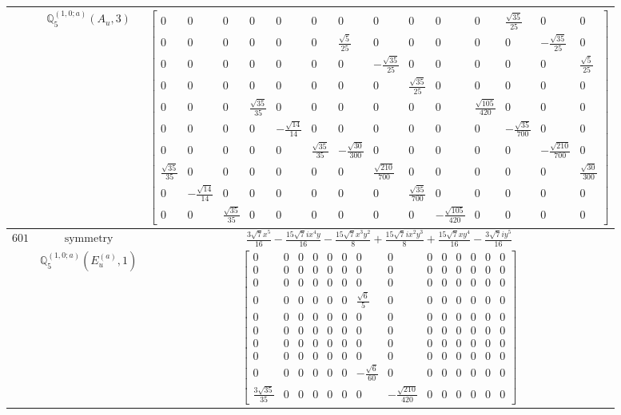 \documentclass[fleqn,8pt,landscape]{jsarticle}
\begin{document}
\begin{longtable}{ccc}
$  $ & $ \mathbb{Q}_{5}^{(1,0;a)}(A_{u},3) $ & $ \begin{bmatrix} 0 & 0 & 0 & 0 & 0 & 0 & 0 & 0 & 0 & 0 & 0 & \frac{\sqrt{35}}{25} & 0 & 0 \\ 0 & 0 & 0 & 0 & 0 & 0 & \frac{\sqrt{5}}{25} & 0 & 0 & 0 & 0 & 0 & - \frac{\sqrt{35}}{25} & 0 \\ 0 & 0 & 0 & 0 & 0 & 0 & 0 & - \frac{\sqrt{35}}{25} & 0 & 0 & 0 & 0 & 0 & \frac{\sqrt{5}}{25} \\ 0 & 0 & 0 & 0 & 0 & 0 & 0 & 0 & \frac{\sqrt{35}}{25} & 0 & 0 & 0 & 0 & 0 \\ 0 & 0 & 0 & \frac{\sqrt{35}}{35} & 0 & 0 & 0 & 0 & 0 & 0 & \frac{\sqrt{105}}{420} & 0 & 0 & 0 \\ 0 & 0 & 0 & 0 & - \frac{\sqrt{14}}{14} & 0 & 0 & 0 & 0 & 0 & 0 & - \frac{\sqrt{35}}{700} & 0 & 0 \\ 0 & 0 & 0 & 0 & 0 & \frac{\sqrt{35}}{35} & - \frac{\sqrt{30}}{300} & 0 & 0 & 0 & 0 & 0 & - \frac{\sqrt{210}}{700} & 0 \\ \frac{\sqrt{35}}{35} & 0 & 0 & 0 & 0 & 0 & 0 & \frac{\sqrt{210}}{700} & 0 & 0 & 0 & 0 & 0 & \frac{\sqrt{30}}{300} \\ 0 & - \frac{\sqrt{14}}{14} & 0 & 0 & 0 & 0 & 0 & 0 & \frac{\sqrt{35}}{700} & 0 & 0 & 0 & 0 & 0 \\ 0 & 0 & \frac{\sqrt{35}}{35} & 0 & 0 & 0 & 0 & 0 & 0 & - \frac{\sqrt{105}}{420} & 0 & 0 & 0 & 0 \end{bmatrix} $ \\ \hline
$ 601 $ & $ \text{symmetry} $ & $ \frac{3 \sqrt{7} x^{5}}{16} - \frac{15 \sqrt{7} i x^{4} y}{16} - \frac{15 \sqrt{7} x^{3} y^{2}}{8} + \frac{15 \sqrt{7} i x^{2} y^{3}}{8} + \frac{15 \sqrt{7} x y^{4}}{16} - \frac{3 \sqrt{7} i y^{5}}{16} $ \\
$  $ & $ \mathbb{Q}_{5}^{(1,0;a)}(E_{u}^{(a)},1) $ & $ \begin{bmatrix} 0 & 0 & 0 & 0 & 0 & 0 & 0 & 0 & 0 & 0 & 0 & 0 & 0 & 0 \\ 0 & 0 & 0 & 0 & 0 & 0 & 0 & 0 & 0 & 0 & 0 & 0 & 0 & 0 \\ 0 & 0 & 0 & 0 & 0 & 0 & 0 & 0 & 0 & 0 & 0 & 0 & 0 & 0 \\ 0 & 0 & 0 & 0 & 0 & 0 & \frac{\sqrt{6}}{5} & 0 & 0 & 0 & 0 & 0 & 0 & 0 \\ 0 & 0 & 0 & 0 & 0 & 0 & 0 & 0 & 0 & 0 & 0 & 0 & 0 & 0 \\ 0 & 0 & 0 & 0 & 0 & 0 & 0 & 0 & 0 & 0 & 0 & 0 & 0 & 0 \\ 0 & 0 & 0 & 0 & 0 & 0 & 0 & 0 & 0 & 0 & 0 & 0 & 0 & 0 \\ 0 & 0 & 0 & 0 & 0 & 0 & 0 & 0 & 0 & 0 & 0 & 0 & 0 & 0 \\ 0 & 0 & 0 & 0 & 0 & 0 & - \frac{\sqrt{6}}{60} & 0 & 0 & 0 & 0 & 0 & 0 & 0 \\ \frac{3 \sqrt{35}}{35} & 0 & 0 & 0 & 0 & 0 & 0 & - \frac{\sqrt{210}}{420} & 0 & 0 & 0 & 0 & 0 & 0 \end{bmatrix} $ \\ \hline

\end{longtable}
\end{document}
